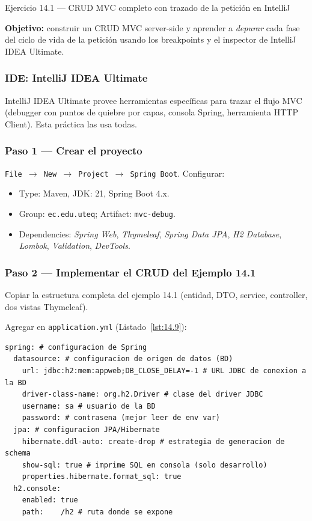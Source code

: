 \begin{cajaejercicio}{Ejercicio 14.1 --- CRUD MVC completo con trazado de la petición en IntelliJ}

\textbf{Objetivo:} construir un CRUD MVC server-side y aprender a
\emph{depurar} cada fase del ciclo de vida de la petición usando los
breakpoints y el inspector de IntelliJ IDEA Ultimate.

\subsubsection*{IDE: IntelliJ IDEA Ultimate}

IntelliJ IDEA Ultimate provee herramientas específicas para
trazar el flujo MVC (debugger con puntos de quiebre por capas,
consola Spring, herramienta HTTP Client). Esta práctica las usa
todas.


\subsubsection*{Paso 1 --- Crear el proyecto}

\texttt{File $\rightarrow$ New $\rightarrow$ Project $\rightarrow$
Spring Boot}. Configurar:
\begin{itemize}
\item Type: Maven, JDK: 21, Spring Boot 4.x.
\item Group: \texttt{ec.edu.uteq}; Artifact: \texttt{mvc-debug}.
\item Dependencies: \emph{Spring Web}, \emph{Thymeleaf}, \emph{Spring
Data JPA}, \emph{H2 Database}, \emph{Lombok}, \emph{Validation},
\emph{DevTools}.
\end{itemize}

\subsubsection*{Paso 2 --- Implementar el CRUD del Ejemplo 14.1}

Copiar la estructura completa del ejemplo 14.1 (entidad, DTO,
service, controller, dos vistas Thymeleaf).

Agregar en \texttt{application.yml} (Listado~\ref{lst:14.9}):
\begin{lstlisting}[style=yaml,numbers=none,caption={Ejemplo de YAML},label=lst:14.9]
spring: # configuracion de Spring
  datasource: # configuracion de origen de datos (BD)
    url: jdbc:h2:mem:appweb;DB_CLOSE_DELAY=-1 # URL JDBC de conexion a la BD
    driver-class-name: org.h2.Driver # clase del driver JDBC
    username: sa # usuario de la BD
    password: # contrasena (mejor leer de env var)
  jpa: # configuracion JPA/Hibernate
    hibernate.ddl-auto: create-drop # estrategia de generacion de schema
    show-sql: true # imprime SQL en consola (solo desarrollo)
    properties.hibernate.format_sql: true
  h2.console:
    enabled: true
    path:    /h2 # ruta donde se expone
\end{lstlisting}


\end{cajaejercicio}
